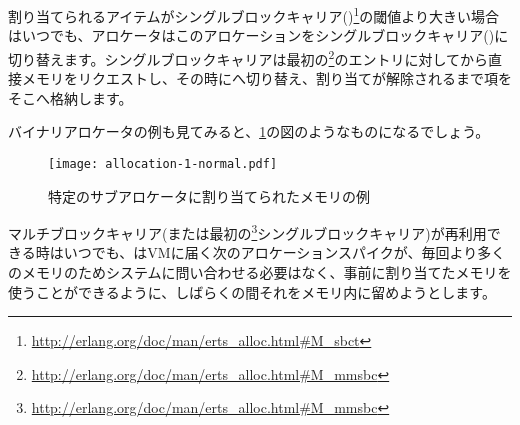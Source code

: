 割り当てられるアイテムがシングルブロックキャリア()\footnote{\href{http://erlang.org/doc/man/erts\_alloc.html\#M\_sbct}{http://erlang.org/doc/man/erts\_alloc.html\#M\_sbct}}の閾値より大きい場合はいつでも、アロケータはこのアロケーションをシングルブロックキャリア()に切り替えます。シングルブロックキャリアは最初の\footnote{\href{http://erlang.org/doc/man/erts\_alloc.html\#M\_mmsbc}{http://erlang.org/doc/man/erts\_alloc.html\#M\_mmsbc}}のエントリに対してから直接メモリをリクエストし、その時にへ切り替え、割り当てが解除されるまで項をそこへ格納します。

バイナリアロケータの例も見てみると、\ref{fig:allocation-1-normal}の図のようなものになるでしょう。

\begin{figure}
  \texttt{[image: allocation-1-normal.pdf]}%
  \caption{特定のサブアロケータに割り当てられたメモリの例}%
   \label{fig:allocation-1-normal}
\end{figure}
\FloatBarrier

マルチブロックキャリア(または最初の\footnote{\href{http://erlang.org/doc/man/erts\_alloc.html\#M\_mmsbc}{http://erlang.org/doc/man/erts\_alloc.html\#M\_mmsbc}}シングルブロックキャリア)が再利用できる時はいつでも、はVMに届く次のアロケーションスパイクが、毎回より多くのメモリのためシステムに問い合わせる必要はなく、事前に割り当てたメモリを使うことができるように、しばらくの間それをメモリ内に留めようとします。

